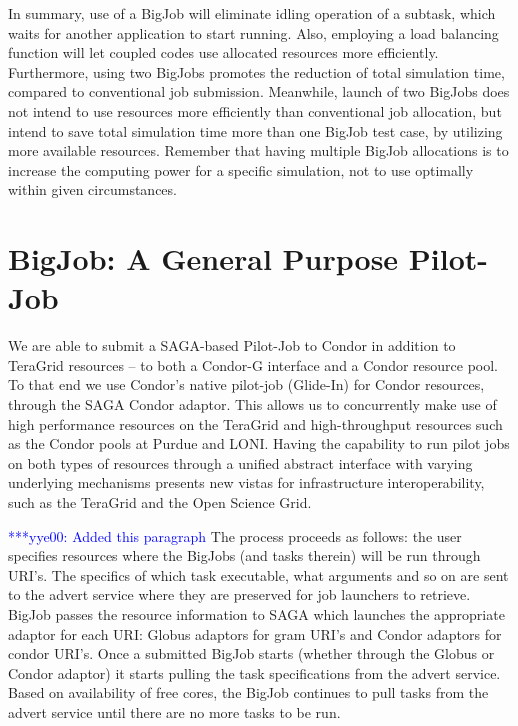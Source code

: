 \documentclass[conference,final]{IEEEtran}
\newcommand{\yyenote}[1]{ {\textcolor{blue} { ***yye00: #1 }}}
\begin{document}
In summary, use of a BigJob will eliminate idling operation of a
subtask, which waits for another application to start running. Also,
employing a load balancing function will let coupled codes use
allocated resources more efficiently. Furthermore, using two BigJobs
promotes the reduction of total simulation time, compared to
conventional job submission. Meanwhile, launch of two BigJobs does not
intend to use resources more efficiently than conventional job
allocation, but intend to save total simulation time more than one
BigJob test case, by utilizing more available resources. Remember that
having multiple BigJob allocations is to increase the computing power
for a specific simulation, not to use optimally within given
circumstances.


\section{BigJob: A General Purpose Pilot-Job}

We are able to submit a SAGA-based Pilot-Job to Condor in addition to
TeraGrid resources -- to both a Condor-G interface and a Condor
resource pool. To that end we use Condor's native pilot-job (Glide-In)
for Condor resources, through the SAGA Condor adaptor. This allows us
to concurrently make use of high performance resources on the TeraGrid
and high-throughput resources such as the Condor pools at Purdue and
LONI. Having the capability to run pilot jobs on both types of
resources through a unified abstract interface with varying underlying
mechanisms presents new vistas for infrastructure interoperability,
such as the TeraGrid and the Open Science Grid.

\yyenote{Added this paragraph} The process proceeds as follows: the
user specifies resources where the BigJobs (and tasks therein) will be
run through URI's. The specifics of which task executable, what
arguments and so on are sent to the advert service where they are
preserved for job launchers to retrieve. BigJob passes the resource
information to SAGA which launches the appropriate adaptor for each
URI: Globus adaptors for gram URI's and Condor adaptors for condor
URI's. Once a submitted BigJob starts (whether through the Globus or
Condor adaptor) it starts pulling the task specifications from the
advert service. Based on availability of free cores, the BigJob
continues to pull tasks from the advert service until there are no
more tasks to be run.
\end{document}
